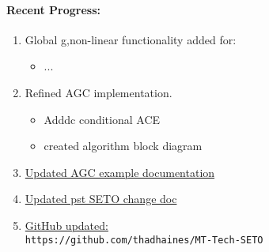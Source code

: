 \documentclass[12pt]{article}
\begin{document}
\begin{multicols}{2}
\raggedright

\paragraph{Recent Progress:}
	\begin{enumerate}
		\itemsep0em 
		\item Global g,non-linear functionality added for: %
		\begin{minipage}{\linewidth}
		\begin{multicols}{2}
				\begin{itemize}
		\itemsep0em 
				\footnotesize
				\raggedright
					\item ...
				\end{itemize}
		\end{multicols}
		\end{minipage}
		
		\item Refined AGC implementation.
				\begin{minipage}{\linewidth}
								\begin{itemize}
						\itemsep0em 
								\footnotesize
						\item Adddc conditional ACE
						\item created algorithm block diagram
									
								\end{itemize}
						\end{minipage}
		\item \href{https://github.com/thadhaines/MT-Tech-SETO/blob/master/researchDocs/TEX/one-offs/200720-PSTandAGC/200720-PSTandAGC.pdf}
				{Updated AGC example documentation}
		\item \href{https://github.com/thadhaines/MT-Tech-SETO/blob/master/researchDocs/TEX/one-offs/200709-PSTsetoVersionChanges/200709-PSTsetoVersionChanges.pdf}
		{Updated pst SETO change doc}
		
		\item \href{https://github.com/thadhaines/MT-Tech-SETO}{GitHub updated:}\\
	{\footnotesize \verb|https://github.com/thadhaines/MT-Tech-SETO| }\\
	\end{enumerate}
	


\end{multicols}
\end{document}
